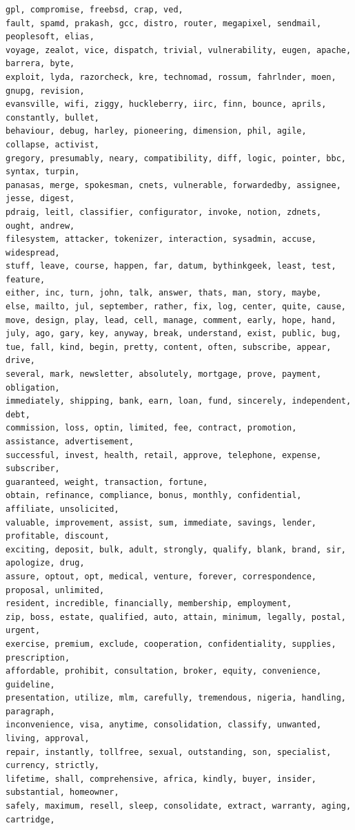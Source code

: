 \documentclass[a4paper,12pt]{article}
\begin{document}
\begin{verbatim}
gpl, compromise, freebsd, crap, ved, 
fault, spamd, prakash, gcc, distro, router, megapixel, sendmail, peoplesoft, elias, 
voyage, zealot, vice, dispatch, trivial, vulnerability, eugen, apache, barrera, byte,
exploit, lyda, razorcheck, kre, technomad, rossum, fahrlnder, moen, gnupg, revision, 
evansville, wifi, ziggy, huckleberry, iirc, finn, bounce, aprils, constantly, bullet, 
behaviour, debug, harley, pioneering, dimension, phil, agile, collapse, activist, 
gregory, presumably, neary, compatibility, diff, logic, pointer, bbc, syntax, turpin, 
panasas, merge, spokesman, cnets, vulnerable, forwardedby, assignee, jesse, digest, 
pdraig, leitl, classifier, configurator, invoke, notion, zdnets, ought, andrew, 
filesystem, attacker, tokenizer, interaction, sysadmin, accuse, widespread, 
stuff, leave, course, happen, far, datum, bythinkgeek, least, test, feature, 
either, inc, turn, john, talk, answer, thats, man, story, maybe, 
else, mailto, jul, september, rather, fix, log, center, quite, cause, 
move, design, play, lead, cell, manage, comment, early, hope, hand, 
july, ago, gary, key, anyway, break, understand, exist, public, bug, 
tue, fall, kind, begin, pretty, content, often, subscribe, appear, drive, 
several, mark, newsletter, absolutely, mortgage, prove, payment, obligation, 
immediately, shipping, bank, earn, loan, fund, sincerely, independent, debt, 
commission, loss, optin, limited, fee, contract, promotion, assistance, advertisement, 
successful, invest, health, retail, approve, telephone, expense, subscriber, 
guaranteed, weight, transaction, fortune, 
obtain, refinance, compliance, bonus, monthly, confidential, affiliate, unsolicited, 
valuable, improvement, assist, sum, immediate, savings, lender, profitable, discount, 
exciting, deposit, bulk, adult, strongly, qualify, blank, brand, sir, apologize, drug, 
assure, optout, opt, medical, venture, forever, correspondence, proposal, unlimited, 
resident, incredible, financially, membership, employment, 
zip, boss, estate, qualified, auto, attain, minimum, legally, postal, urgent, 
exercise, premium, exclude, cooperation, confidentiality, supplies, prescription, 
affordable, prohibit, consultation, broker, equity, convenience, guideline, 
presentation, utilize, mlm, carefully, tremendous, nigeria, handling, paragraph, 
inconvenience, visa, anytime, consolidation, classify, unwanted, living, approval, 
repair, instantly, tollfree, sexual, outstanding, son, specialist, currency, strictly, 
lifetime, shall, comprehensive, africa, kindly, buyer, insider, substantial, homeowner, 
safely, maximum, resell, sleep, consolidate, extract, warranty, aging, cartridge, 

\end{verbatim}
\end{document}
